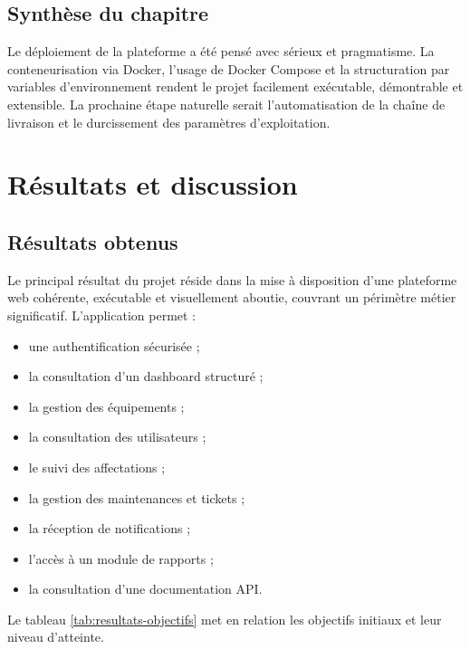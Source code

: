 ﻿\documentclass[12pt,a4paper,oneside]{report}
\begin{document}
\section{Synthèse du chapitre}
Le déploiement de la plateforme a été pensé avec sérieux et pragmatisme. La conteneurisation via Docker, l'usage de Docker Compose et la structuration par variables d'environnement rendent le projet facilement exécutable, démontrable et extensible. La prochaine étape naturelle serait l'automatisation de la chaîne de livraison et le durcissement des paramètres d'exploitation.












\chapter{Résultats et discussion}
\label{chap:results}

\section{Résultats obtenus}
Le principal résultat du projet réside dans la mise à disposition d'une plateforme web cohérente, exécutable et visuellement aboutie, couvrant un périmètre métier significatif. L'application permet :
\begin{itemize}
  \item une authentification sécurisée ;
  \item la consultation d'un dashboard structuré ;
  \item la gestion des équipements ;
  \item la consultation des utilisateurs ;
  \item le suivi des affectations ;
  \item la gestion des maintenances et tickets ;
  \item la réception de notifications ;
  \item l'accès à un module de rapports ;
  \item la consultation d'une documentation API.
\end{itemize}

Le tableau \ref{tab:resultats-objectifs} met en relation les objectifs initiaux et leur niveau d'atteinte.
\end{document}
